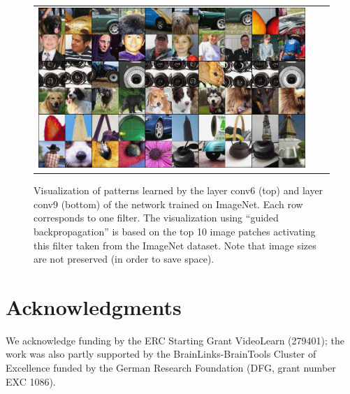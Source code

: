 \documentclass{article} %
\begin{document}
\begin{figure}
\begin{tabular}{ccc}
  \includegraphics[height=.25\textwidth]{maxactiv_pool3_img_crop.png} \\
\end{tabular}
\caption{Visualization of patterns learned by the layer conv6 (top)
  and layer conv9 (bottom) of the network trained on ImageNet. Each
  row corresponds to one filter. The
  visualization using ``guided backpropagation'' is based on the top 10 image
  patches activating this filter taken from the ImageNet dataset. Note
  that image sizes are not preserved (in order to save space).}
\label{fig:pool_reconstructions}
\end{figure}

\section*{Acknowledgments}
We acknowledge funding by the ERC Starting Grant VideoLearn (279401); the work was also partly supported by the BrainLinks-BrainTools Cluster of
Excellence funded by the German Research Foundation (DFG, grant number EXC 1086).





\end{document}
